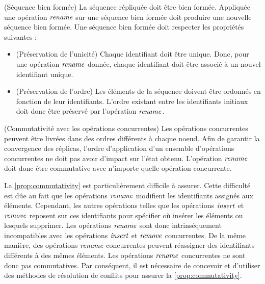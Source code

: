 \begin{property}(Séquence bien formée)
  La séquence répliquée doit être bien formée.
  Appliquée une opération $\mathit{rename}$ sur une séquence bien formée doit produire une nouvelle séquence bien formée.
  Une séquence bien formée doit respecter les propriétés suivantes :
  \begin{itemize}[noitemsep]
    \item[~]
    \begin{subproperty}(Préservation de l'unicité)
      \label{prop:unicity}
      Chaque identifiant doit être unique.
      Donc, pour une opération $\mathit{rename}$ donnée, chaque identifiant doit être associé à un nouvel identifiant unique.
    \end{subproperty}
    \item[~]
    \begin{subproperty}(Préservation de l'ordre)
      \label{prop:order}
      Les éléments de la séquence doivent être ordonnés en fonction de leur identifiants.
      L'ordre existant entre les identifiants initiaux doit donc être préservé par l'opération $\mathit{rename}$.
    \end{subproperty}
  \end{itemize}
\end{property}

\begin{property}(Commutativité avec les opérations concurrentes)
  \label{prop:commutativity}
  Les opérations concurrentes peuvent être livrées dans des ordres différents à chaque noeud.
  Afin de garantir la convergence des réplicas, l'ordre d'application d'un ensemble d'opérations concurrentes ne doit pas avoir d'impact sur l'état obtenu.
  L'opération $\mathit{rename}$ doit donc être commutative avec n'importe quelle opération concurrente.
\end{property}

La \autoref{prop:commutativity} est particulièrement difficile à assurer.
Cette difficulté est dûe au fait que les opérations $\mathit{rename}$ modifient les identifiants assignés aux éléments.
Cependant, les autres opérations telles que les opérations $\mathit{insert}$ et $\mathit{remove}$ reposent sur ces identifiants pour spécifier où insérer les éléments ou lesquels supprimer.
Les opérations $\mathit{rename}$ sont donc intrinséquement incompatibles avec les opérations $\mathit{insert}$ et $\mathit{remove}$ concurrentes.
De la même manière, des opérations $\mathit{rename}$ concurrentes peuvent réassigner des identifiants différents à des mêmes éléments.
Les opérations $\mathit{rename}$ concurrentes ne sont donc pas commutatives.
Par conséquent, il est nécessaire de concevoir et d'utiliser des méthodes de résolution de conflits pour assurer la \autoref{prop:commutativity}.\\

